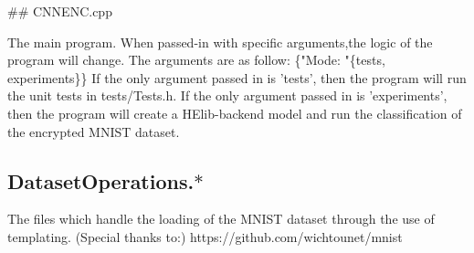 \#\# C\+N\+N\+E\+N\+C.\+cpp 
\begin{DoxyCode}
The main program. When passed-in with specific arguments,the logic of the program will change.
The arguments are as follow:
\{"Mode: "\{tests, experiments\}\}
If the only argument passed in is 'tests', then the program will run the unit tests in tests/Tests.h.  
If the only argument passed in is 'experiments', then the program will create a HElib-backend model  
and run the classification of the encrypted MNIST dataset. 
\end{DoxyCode}


\subsection*{Dataset\+Operations.$\ast$}


\begin{DoxyCode}
The files which handle the loading of the MNIST dataset through the use of templating.
(Special thanks to:) https://github.com/wichtounet/mnist
\end{DoxyCode}
 